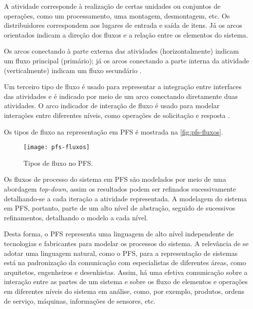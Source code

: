 A atividade corresponde à realização de certas unidades ou conjuntos de operações, como um processamento, uma montagem, desmontagem, etc. Os distribuidores correspondem aos lugares de entrada e saída de itens. Já os arcos orientados indicam a direção dos fluxos e a relação entre os elementos do sistema.

Os arcos conectando à parte externa das atividades (horizontalmente) indicam um fluxo principal (primário); já os arcos conectando a parte interna da atividade (verticalmente) indicam um fluxo secundário \cite{miyagi1996controle}.

Um terceiro tipo de fluxo é usado para representar a integração entre interfaces das atividades e é indicado por meio de um arco conectando diretamente duas atividades. O arco indicador de interação de fluxo é usado para modelar interações entre diferentes níveis, como operações de solicitação e resposta \cite{pisching2018pfs}.

Os tipos de fluxo na representação em PFS é mostrada na \autoref{fig:pfs-fluxos}.

\begin{figure}[htb]
	\centering
	\texttt{[image: pfs-fluxos]}
	\caption{Tipos de fluxo no PFS.}
	\label{fig:pfs-fluxos}
\end{figure}

Os fluxos de processo do sistema em PFS são modelados por meio de uma abordagem \textit{top-down}, assim os resultados podem ser refinados sucessivamente detalhando-se a cada iteração a atividade representada. A modelagem do sistema em PFS, portanto, parte de um alto nível de abstração, seguido de sucessivos refinamentos, detalhando o modelo a cada nível.

Desta forma, o PFS representa uma linguagem de alto nível independente de tecnologias e fabricantes para modelar os processos do sistema. A relevância de se adotar uma linguagem natural, como o PFS, para a representação de sistemas está na padronização da comunicação com especialistas de diferentes áreas, como arquitetos, engenheiros e desenhistas. Assim, há uma efetiva comunicação sobre a interação entre as partes de um sistema e sobre os fluxo de elementos e operações em diferentes níveis do sistema em análise, como, por exemplo, produtos, ordens de serviço, máquinas, informações de sensores, etc.
